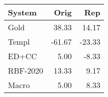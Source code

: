 \begin{tabular}{lrr}
\toprule
System & Orig & Rep \\
\midrule
Gold & 38.33 & 14.17 \\
Templ & -61.67 & -23.33 \\
ED+CC & 5.00 & -8.33 \\
RBF-2020 & 13.33 & 9.17 \\
Macro & 5.00 & 8.33 \\
\bottomrule
\end{tabular}
